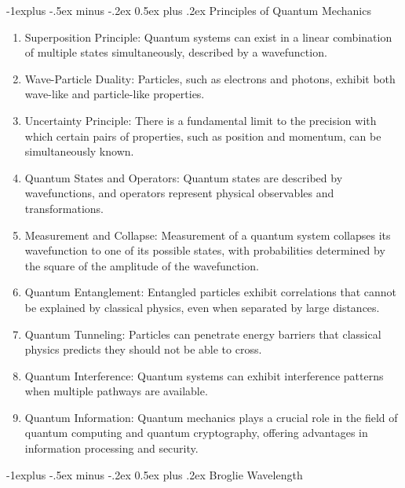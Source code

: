 \documentclass[10pt,landscape]{article}
\makeatletter
\renewcommand{\subsection}{\@startsection{subsection}{2}{0mm}%
                                {-1explus -.5ex minus -.2ex}%
                                {0.5ex plus .2ex}%
                                {\normalfont\normalsize\bfseries}}
\makeatother
\begin{document}
\begin{multicols}{3}
\subsection{Principles of Quantum Mechanics}

\begin{enumerate}
	\item Superposition Principle: Quantum systems can exist in a linear combination of multiple states simultaneously, described by a wavefunction.
	
	\item Wave-Particle Duality: Particles, such as electrons and photons, exhibit both wave-like and particle-like properties.
	
	\item Uncertainty Principle: There is a fundamental limit to the precision with which certain pairs of properties, such as position and momentum, can be simultaneously known.
	
	\item Quantum States and Operators: Quantum states are described by wavefunctions, and operators represent physical observables and transformations.
	
	\item Measurement and Collapse: Measurement of a quantum system collapses its wavefunction to one of its possible states, with probabilities determined by the square of the amplitude of the wavefunction.
	
	\item Quantum Entanglement: Entangled particles exhibit correlations that cannot be explained by classical physics, even when separated by large distances.
	
	\item Quantum Tunneling: Particles can penetrate energy barriers that classical physics predicts they should not be able to cross.
	
	\item Quantum Interference: Quantum systems can exhibit interference patterns when multiple pathways are available.
	
	\item Quantum Information: Quantum mechanics plays a crucial role in the field of quantum computing and quantum cryptography, offering advantages in information processing and security.
\end{enumerate}

\subsection{Broglie Wavelength}


\end{multicols}
\end{document}
